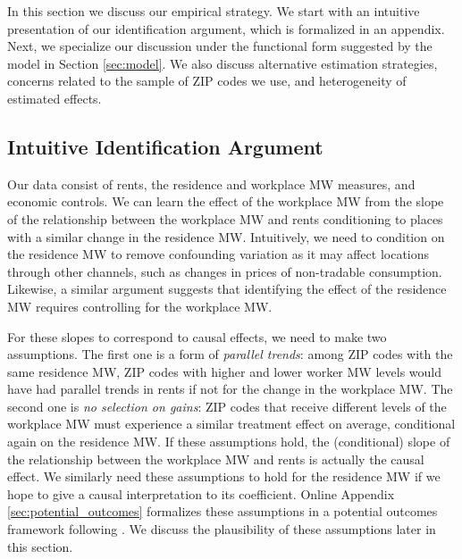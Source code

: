 
In this section we discuss our empirical strategy.
We start with an intuitive presentation of our identification argument, which
is formalized in an appendix.
Next, we specialize our discussion under the functional form suggested by
the model in Section \ref{sec:model}. 
We also discuss alternative estimation strategies, concerns related to
the sample of ZIP codes we use, and heterogeneity of estimated effects.

\subsection{Intuitive Identification Argument}

Our data consist of rents, the residence and workplace MW measures, and 
economic controls.
We can learn the effect of the workplace MW from the slope of the relationship 
between the workplace MW and rents conditioning to places with a similar change 
in the residence MW.
Intuitively, we need to condition on the residence MW to remove confounding 
variation as it may affect locations through other channels, 
such as changes in prices of non-tradable consumption.
Likewise, a similar argument suggests that identifying the effect of the 
residence MW requires controlling for the workplace MW. 

For these slopes to correspond to causal effects, we need to make 
two assumptions.
The first one is a form of \textit{parallel trends}: among ZIP codes with 
the same residence MW, ZIP codes with higher and lower worker MW levels would 
have had parallel trends in rents if not for the change in the workplace MW.
The second one is \textit{no selection on gains}: ZIP codes that receive
different levels of the workplace MW must experience a similar treatment effect
on average, conditional again on the residence MW.
If these assumptions hold, the (conditional) slope of the relationship between
the workplace MW and rents is actually the causal effect. 
We similarly need these assumptions to hold for the residence MW if we hope 
to give a causal interpretation to its coefficient.
Online Appendix \ref{sec:potential_outcomes} formalizes these assumptions in a 
potential outcomes framework following \textcite{CallawayEtAl2021}.
We discuss the plausibility of these assumptions later in this section.

